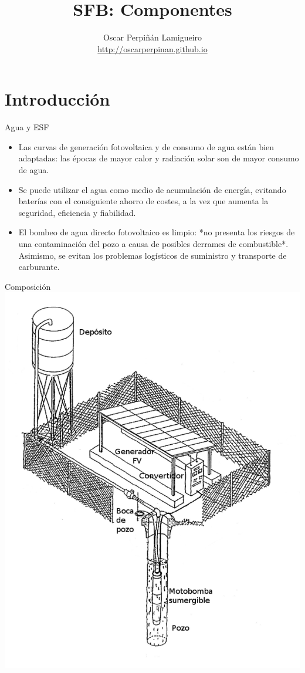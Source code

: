 \documentclass[xcolor={usenames,svgnames,dvipsnames}]{beamer}
\author{Oscar Perpiñán Lamigueiro \\ \url{http://oscarperpinan.github.io}}
\date{}
\title{SFB: Componentes}
\begin{document}
\maketitle

\section{Introducción}
\label{sec-1}

\begin{frame}[label=sec-1-0-1]{Agua y ESF}
\begin{itemize}
\item Las \alert{curvas de generación fotovoltaica y de consumo de agua están
bien adaptadas}: las épocas de mayor calor y radiación solar son de
mayor consumo de agua.

\item Se puede utilizar el \alert{agua como medio de acumulación de energía},
evitando baterías con el consiguiente ahorro de costes, a la vez que
aumenta la seguridad, eficiencia y fiabilidad.

\item El bombeo de agua directo fotovoltaico es limpio: *no presenta los
riesgos de una contaminación del pozo a causa de posibles derrames de
combustible*. Asimismo, se evitan los problemas logísticos de
suministro y transporte de carburante.
\end{itemize}
\end{frame}


\begin{frame}[label=sec-1-0-2]{Composición}
\includegraphics[width=.9\linewidth]{../figs/EsquemaBombeo_oscar.pdf}
\end{frame}
\end{document}
